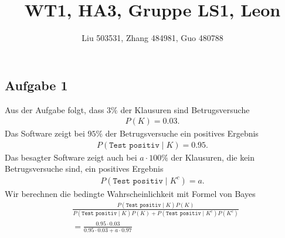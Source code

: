 \documentclass[fleqn,draft,a5paper]{article}
\title{WT1, HA3, Gruppe LS1, Leon}
\author{Liu 503531, Zhang 484981, Guo 480788}
\theoremstyle{remark}
\begin{document}
\maketitle

\subsection{Aufgabe 1}
Aus der Aufgabe folgt, dass $3 \%$ der Klausuren sind
Betrugsversuche
\begin{align*}
  P(K) = 0.03.
\end{align*}
Das Software zeigt bei $95 \%$ der
Betrugsversuche ein positives Ergebnis
\begin{align*}
  P(\texttt{Test positiv} \mid K) = 0.95.
\end{align*}
Das besagter Software zeigt auch bei $a \cdot 100\%$ der Klausuren, die kein
Betrugsversuche sind, ein positives Ergebnis
\begin{align*}
  P(\texttt{Test positiv} \mid K^{c}) = a.
\end{align*}
Wir berechnen die bedingte Wahrscheinlichkeit mit Formel von Bayes
\begin{align*}
  &\frac{P(\texttt{Test positiv} \mid K)P(K)}{P(\texttt{Test positiv} \mid K)P(K)+P(\texttt{Test
    positiv} \mid K^{c})P(K^{c})} \\
  &= \frac{0.95 \cdot 0.03}{0.95 \cdot 0.03 + a \cdot 0.97}
\end{align*}
\end{document}
